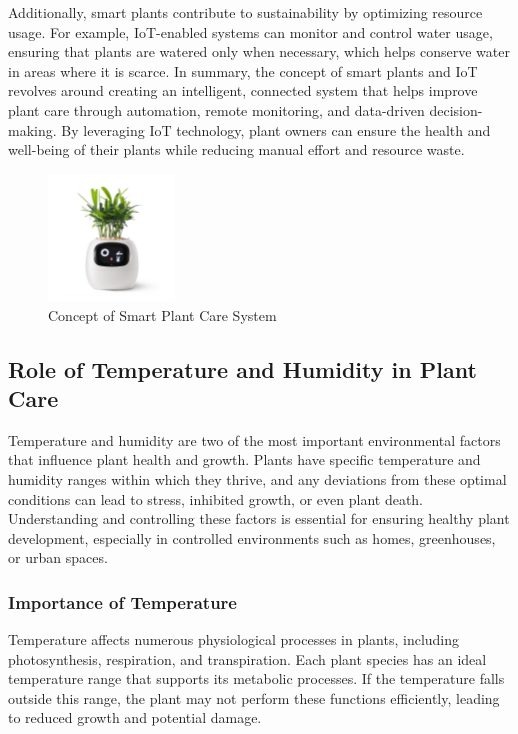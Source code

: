 \documentclass[12pt,a4paper,oneside,english]{book}
\begin{document}
Additionally, smart plants contribute to sustainability by optimizing resource usage. For example, IoT-enabled systems can monitor and control water usage, ensuring that plants are watered only when necessary, which helps conserve water in areas where it is scarce.
In summary, the concept of smart plants and IoT revolves around creating an intelligent, connected system that helps improve plant care through automation, remote monitoring, and data-driven decision-making. By leveraging IoT technology, plant owners can ensure the health and well-being of their plants while reducing manual effort and resource waste.

\begin{figure}[!h]
    \centering
    \includegraphics[width=0.3\textwidth]{images/petplant.jpg}
    \caption{Concept of Smart Plant Care System}
    \label{fig:smartpetplant}
\end{figure}




\subsection{Role of Temperature and Humidity in Plant Care}

Temperature and humidity are two of the most important environmental factors that influence plant health and growth. Plants have specific temperature and humidity ranges within which they thrive, and any deviations from these optimal conditions can lead to stress, inhibited growth, or even plant death. Understanding and controlling these factors is essential for ensuring healthy plant development, especially in controlled environments such as homes, greenhouses, or urban spaces.

\subsubsection{Importance of Temperature}

Temperature affects numerous physiological processes in plants, including photosynthesis, respiration, and transpiration. Each plant species has an ideal temperature range that supports its metabolic processes. If the temperature falls outside this range, the plant may not perform these functions efficiently, leading to reduced growth and potential damage.
\end{document}

